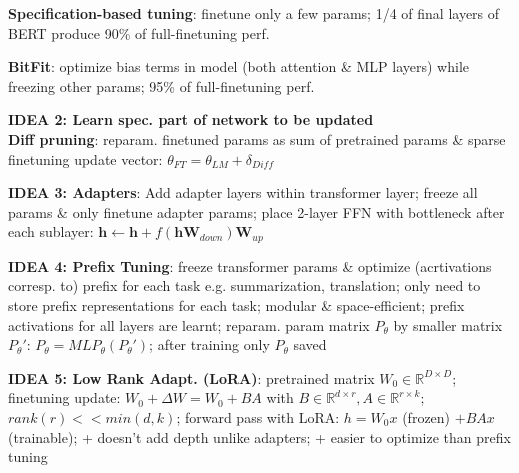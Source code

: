 \textbf{Specification-based tuning}: finetune only a few params; 1/4 of final layers of BERT produce 90\% of full-finetuning perf.

\textbf{BitFit}: optimize bias terms in model (both attention \& MLP layers) while freezing other params; 95\% of full-finetuning perf.

\textbf{IDEA 2: Learn spec. part of network to be updated} \\
\textbf{Diff pruning}: reparam. finetuned params as sum of pretrained params \& sparse finetuning update vector: $\theta_{FT}=\theta_{LM}+\delta_{Diff}$

\textbf{IDEA 3: Adapters}:
Add adapter layers within transformer layer; freeze all params \& only finetune adapter params; place 2-layer FFN with bottleneck after each sublayer: $\mathbf{h} \leftarrow \mathbf{h} + f(\mathbf{h}\mathbf{W}_{down})\mathbf{W}_{up}$

\textbf{IDEA 4: Prefix Tuning}: freeze transformer params \& optimize (acrtivations corresp. to) prefix for each task e.g. summarization, translation; only need to store prefix representations for each task; modular \& space-efficient; prefix activations for all layers are learnt; reparam. param matrix $P_\theta$ by smaller matrix $P_\theta'$: $P_\theta = MLP_\theta(P_\theta')$; after training only $P_\theta$ saved

\textbf{IDEA 5: Low Rank Adapt. (LoRA)}: pretrained matrix $W_0\in\mathbb{R}^{D\times D}$; finetuning update: $W_0+\Delta W = W_0+BA$ with $B\in \mathbb{R}^{d\times r}, A\in \mathbb{R}^{r\times k}$; $rank(r) << min(d,k)$; forward pass with LoRA: $h=W_0 x$ (frozen) $+ BAx$ (trainable); \textcolor{mygreen}{+ doesn't add depth unlike adapters; + easier to optimize than prefix tuning}
